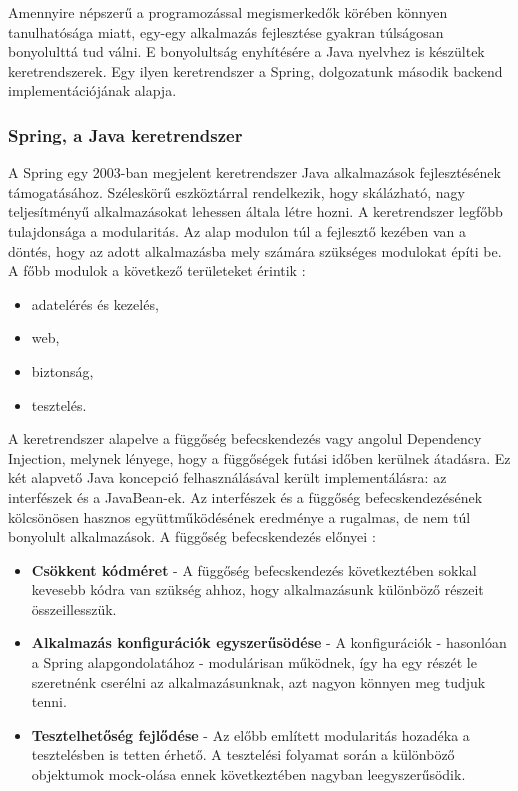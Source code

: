 \documentclass[12pt]{article}
\begin{document}
Amennyire népszerű a programozással megismerkedők körében könnyen tanulhatósága miatt, egy-egy alkalmazás fejlesztése gyakran túlságosan bonyolulttá tud válni. E bonyolultság enyhítésére a Java nyelvhez is készültek keretrendszerek. Egy ilyen keretrendszer a Spring, dolgozatunk második backend implementációjának alapja.

\subsubsection{Spring, a Java keretrendszer}

A Spring egy 2003-ban megjelent keretrendszer Java alkalmazások fejlesztésének támogatásához. Széleskörű eszköztárral rendelkezik, hogy skálázható, nagy teljesítményű alkalmazásokat lehessen általa létre hozni. A keretrendszer legfőbb tulajdonsága a modularitás. Az alap modulon túl a fejlesztő kezében van a döntés, hogy az adott alkalmazásba mely számára szükséges modulokat építi be. A főbb modulok a következő területeket érintik \cite{SPRING_BOOK}:
\begin{itemize}
\item adatelérés és kezelés,
\item web,
\item biztonság,
\item tesztelés.
\end{itemize}

A keretrendszer alapelve a függőség befecskendezés vagy angolul Dependency Injection, melynek lényege, hogy a függőségek futási időben kerülnek átadásra. Ez két alapvető Java koncepció felhasználásával került implementálásra: az interfészek és a JavaBean-ek. Az interfészek és a függőség befecskendezésének kölcsönösen hasznos együttműködésének eredménye a rugalmas, de nem túl bonyolult alkalmazások. A függőség befecskendezés előnyei \cite{SPRING_BOOK}:
\begin{itemize}
	\item[]\textbf{Csökkent kódméret}
	- A függőség befecskendezés következtében sokkal kevesebb kódra van szükség ahhoz, hogy alkalmazásunk különböző részeit összeillesszük.
	\item[]\textbf{Alkalmazás konfigurációk egyszerűsödése}
	- A konfigurációk - hasonlóan a Spring alapgondolatához - modulárisan működnek, így ha egy részét le szeretnénk cserélni az alkalmazásunknak, azt nagyon könnyen meg tudjuk tenni.
	\item[]\textbf{Tesztelhetőség fejlődése}
	- Az előbb említett modularitás hozadéka a tesztelésben is tetten érhető. A tesztelési folyamat során a különböző objektumok mock-olása ennek következtében nagyban leegyszerűsödik.
\end{itemize}
\end{document}
